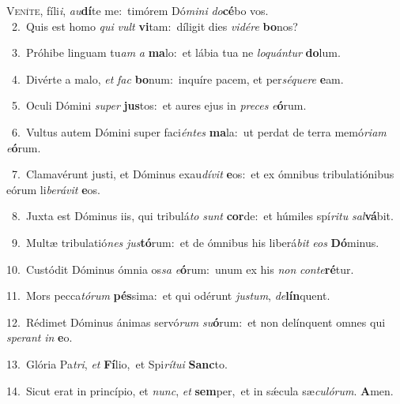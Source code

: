 \lettrine{\initial\textcolor{\initialcolor}{V}}{eníte,} fíli\-\textit{i}\-, \textit{au}\-\textbf{dí}te me:~\star timórem Dó\-\textit{mi}\-\textit{ni} \textit{do}\-\textbf{cé}bo vos.\\
{\numbfont\textcolor{\numbcolor}{~2.}}~Quis est homo \textit{qui} \textit{vult} \textbf{vi}\-tam:~\star díligit dies \textit{vi}\-\textit{dé}\textit{re} \textbf{bo}\-nos?\par
{\numbfont\textcolor{\numbcolor}{~3.}}~Próhibe linguam tu\textit{am} \textit{a} \textbf{ma}\-lo:~\star et lábia tua ne \textit{lo}\-\textit{quán}\textit{tur} \textbf{do}\-lum.\par
{\numbfont\textcolor{\numbcolor}{~4.}}~Divérte a malo, \textit{et} \textit{fac} \textbf{bo}\-num:~\star inquíre pacem, et per\-\textit{sé}\-\textit{que}\textit{re} \textbf{e}\-am.\par
{\numbfont\textcolor{\numbcolor}{~5.}}~Oculi Dómini \textit{su}\-\textit{per} \textbf{jus}\-tos:~\star et aures ejus in \textit{pre}\-\textit{ces} \textit{e}\-\textbf{ó}rum.\par
{\numbfont\textcolor{\numbcolor}{~6.}}~Vultus autem Dómini super faci\-\textit{én}\-\textit{tes} \textbf{ma}\-la:~\star ut perdat de terra memó\-\textit{ri}\-\textit{am} \textit{e}\-\textbf{ó}rum.\par
{\numbfont\textcolor{\numbcolor}{~7.}}~Clamavérunt justi, et Dóminus exau\-\textit{dí}\-\textit{vit} \textbf{e}\-os:~\star et ex ómnibus tribulatiónibus eórum li\-\textit{be}\-\textit{rá}\textit{vit} \textbf{e}\-os.\par
{\numbfont\textcolor{\numbcolor}{~8.}}~Juxta est Dóminus iis, qui tribulá\textit{to} \textit{sunt} \textbf{cor}\-de:~\star et húmiles spí\-\textit{ri}\-\textit{tu} \textit{sal}\-\textbf{vá}bit.\par
{\numbfont\textcolor{\numbcolor}{~9.}}~Multæ tribulatió\textit{nes} \textit{jus}\-\textbf{tó}rum:~\star et de ómnibus his liberá\textit{bit} \textit{e}\-\textit{os} \textbf{Dó}\-minus.\par
{\numbfont\textcolor{\numbcolor}{10.}}~Custódit Dóminus ómnia os\textit{sa} \textit{e}\-\textbf{ó}rum:~\star unum ex his \textit{non} \textit{con}\-\textit{te}\textbf{ré}tur.\par
{\numbfont\textcolor{\numbcolor}{11.}}~Mors pecca\-\textit{tó}\-\textit{rum} \textbf{pés}\-sima:~\star et qui odérunt \textit{jus}\-\textit{tum}, \textit{de}\-\textbf{lín}quent.\par
{\numbfont\textcolor{\numbcolor}{12.}}~Rédimet Dóminus ánimas servó\textit{rum} \textit{su}\-\textbf{ó}rum:~\star et non delínquent omnes qui \textit{spe}\-\textit{rant} \textit{in} \textbf{e}\-o.\par
{\numbfont\textcolor{\numbcolor}{13.}}~Glória Pa\-\textit{tri}\-, \textit{et} \textbf{Fí}\-lio,~\star et Spi\-\textit{rí}\-\textit{tu}\textit{i} \textbf{Sanc}\-to.\par
{\numbfont\textcolor{\numbcolor}{14.}}~Sicut erat in princípio, et \textit{nunc}\-, \textit{et} \textbf{sem}\-per,~\star et in sǽcula sæ\-\textit{cu}\-\textit{ló}\textit{rum}. \textbf{A}\-men.\par
